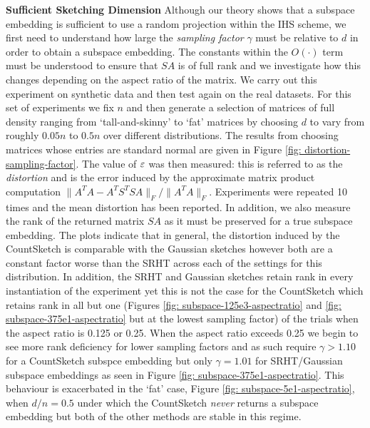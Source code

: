 \noindent\textbf{Sufficient Sketching Dimension}
Although our theory shows that a subspace embedding is sufficient to use a random
projection within the IHS scheme, we first need to understand how large the
\textit{sampling factor} $\gamma$ must be relative to $d$ in order to obtain a subspace
embedding.
The constants within the $O(\cdot)$ term must be understood to ensure that $SA$
is of full rank and we investigate how this changes depending on the aspect
ratio of the matrix.
We carry out this experiment on synthetic data and then test again on the real
datasets.
For this set of experiments we fix $n$ and then generate a selection of matrices
of full density
ranging from `tall-and-skinny' to `fat' matrices by choosing $d$ to vary
from roughly $0.05n$ to $0.5n$ over different distributions.
The results from choosing matrices whose entries are standard normal are given
in Figure \ref{fig: distortion-sampling-factor}.
The value of $\varepsilon$ was then measured: this is referred to as the
\textit{distortion} and is the error induced by the approximate matrix product
computation $\|A^T A - A^T S^T S A \|_F/\|A^TA\|_F$.
Experiments were repeated 10 times and the mean distortion has been reported.
In addition, we also measure the rank of the returned matrix $SA$ as it must
be preserved for a true subspace embedding.
The plots indicate that in general, the distortion induced by the CountSketch is
comparable with the Gaussian sketches however both are a constant factor worse
than the SRHT across each of the settings for this distribution.
In addition, the SRHT and Gaussian sketches retain rank in every instantiation
of the experiment yet this is not the case for the CountSketch which retains
rank in all but one (Figures \ref{fig: subspace-125e3-aspectratio} and \ref{fig: subspace-375e1-aspectratio} but at the lowest
sampling factor) of the trials when the aspect ratio is 0.125 or 0.25.
When the aspect ratio exceeds 0.25 we begin to see more rank deficiency for
lower sampling factors and as such require $\gamma > 1.10$ for a CountSketch
subspce embedding but only $\gamma = 1.01$ for SRHT/Gaussian subspace embeddings as
seen in Figure \ref{fig: subspace-375e1-aspectratio}.
This behaviour is exacerbated in the `fat' case, Figure \ref{fig: subspace-5e1-aspectratio},
when $d/n = 0.5$ under which the CountSketch \textit{never} returns a subspace
embedding but both of the other methods are stable in this regime.



